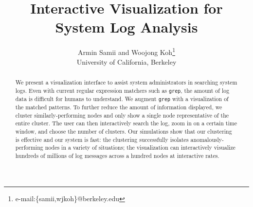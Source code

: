 \documentclass[conference]{style/acmsiggraph}
\title{Interactive Visualization for System Log Analysis}
\author{Armin Samii and Woojong Koh\thanks{e-mail:\{samii,wjkoh\}@berkeley.edu}\\University of California, Berkeley}
\begin{document}

\maketitle

\begin{abstract}

We present a visualization interface to assist system administrators in searching system logs.
Even with current regular expression matchers such as \texttt{grep}, the amount of log data is difficult for humans to understand.
We augment \texttt{grep} with a visualization of the matched patterns.
To further reduce the amount of information displayed, we cluster similarly-performing nodes and only show a single node representative of the entire cluster.
The user can then interactively search the log, zoom in on a certain time window, and choose the number of clusters.
Our simulations show that our clustering is effective and our system is fast:
the clustering successfully isolates anomalously-performing nodes in a variety of situations;
the visualization can interactively visualize hundreds of millions of log messages across a hundred nodes at interactive rates.

\end{abstract}

\end{document}
